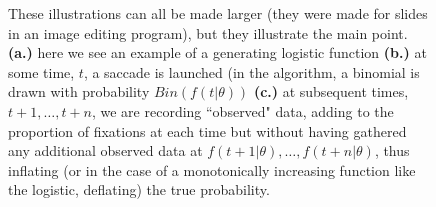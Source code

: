 \documentclass{article}
\begin{document}
\begin{figure}[H]
    \centering
    \caption{These illustrations can all be made larger (they were made for slides in an image editing program), but they illustrate the main point. \textbf{(a.)} here we see an example of a generating logistic function \textbf{(b.)} at some time, $t$, a saccade is launched (in the algorithm, a binomial is drawn with probability $Bin(f(t|\theta))$ \textbf{(c.)} at subsequent times, $t+1, \dots, t+n$, we are recording ``observed" data, adding to the proportion of fixations at each time but without having gathered any additional observed data at $f(t+1 | \theta), \dots,f(t+n | \theta)$, thus inflating (or in the case of a monotonically increasing function like the logistic, deflating) the true probability. }
\label{fig:folly_of_fixation}
\end{figure}
\end{document}
